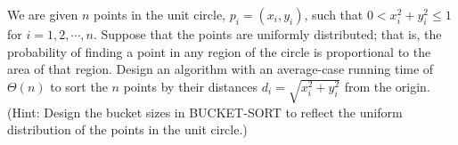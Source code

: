 We are given $n$ points in the unit circle, $p_i=(x_i,y_i)$,
such that $0<x_i^2 + y_i^2 \le 1$ for $i = 1,2,\cdots,n$. 
Suppose that the points are uniformly distributed; that is, 
the probability of finding a point in any region of the circle 
is proportional to the area of that region. Design an algorithm 
with an average-case running time of $\Theta(n)$ to sort the $n$ 
points by their distances $d_i=\sqrt{x_i^2+y_i^2}$ from the origin. 
(Hint: Design the bucket sizes in BUCKET-SORT to reflect the 
uniform distribution of the points in the unit circle.)